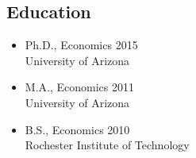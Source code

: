\documentclass[11pt]{res} %
\begin{document}
\begin{resume}
\subsection{Education}


	\begin{itemize}
		\item[] Ph.D., Economics \hfill 2015\\
		University of Arizona

		\item[] M.A., Economics \hfill 2011\\
		University of Arizona

		\item[] B.S.,  Economics \hfill 2010\\
		Rochester Institute of Technology

	\end{itemize}
\vspace{-.2in}

\end{resume}
\end{document}
